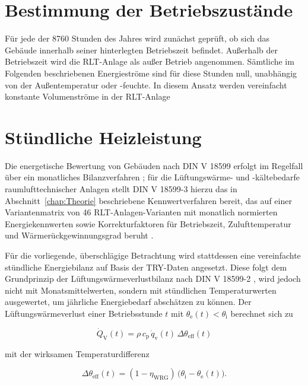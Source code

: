 \documentclass{scrreprt}
\begin{document}
\section{Bestimmung der Betriebszustände}
Für jede der 8760 Stunden des Jahres wird zunächst geprüft, ob sich das
Gebäude innerhalb seiner hinterlegten Betriebszeit befindet.
Außerhalb der Betriebszeit wird die \ac{RLT}-Anlage als außer Betrieb angenommen. Sämtliche im Folgenden beschriebenen Energieströme
sind für diese Stunden null, unabhängig von der Außentemperatur oder
-feuchte. In diesem Ansatz werden vereinfacht konstante Volumenströme in der \ac{RLT}-Anlage 

\section{Stündliche Heizleistung}
Die energetische Bewertung von Gebäuden nach DIN V 18599 erfolgt im
Regelfall über ein monatliches Bilanzverfahren \parencite{DIN1859910};
für die Lüftungswärme- und -kältebedarfe raumlufttechnischer Anlagen
stellt DIN V 18599-3 hierzu das in Abschnitt~\ref{chap:Theorie}
beschriebene Kennwertverfahren bereit, das auf einer Variantenmatrix
von 46 RLT-Anlagen-Varianten mit monatlich normierten Energiekennwerten
sowie Korrekturfaktoren für Betriebszeit, Zulufttemperatur und
Wärmerückgewinnungsgrad beruht \parencite{DIN185993}.

Für die vorliegende, überschlägige Betrachtung wird stattdessen eine
vereinfachte stündliche Energiebilanz auf Basis der \ac{TRY}-Daten
angesetzt. Diese folgt dem Grundprinzip der Lüftungswärmeverlustbilanz
nach DIN V 18599-2 \parencite{DIN185992}, wird jedoch nicht mit
Monatsmittelwerten, sondern mit stündlichen Temperaturwerten
ausgewertet, um jährliche Energiebedarf abschätzen zu können. Der
Lüftungswärmeverlust einer Betriebsstunde $t$ mit
$\theta_{\mathrm{e}}(t) < \theta_{\mathrm{i}}$ berechnet sich zu

\begin{equation}\label{eq:QdotV}
    \dot Q_{\mathrm{V}}(t) = \rho \, c_{\mathrm{p}} \, \dot q_{\mathrm{v}}(t) \, \Delta\theta_{\mathrm{eff}}(t)
\end{equation}

mit der wirksamen Temperaturdifferenz

\begin{equation}\label{eq:dtheta}
    \Delta\theta_{\mathrm{eff}}(t) = (1 - \eta_{\mathrm{WRG}}) \, \bigl(\theta_{\mathrm{i}} - \theta_{\mathrm{e}}(t)\bigr).
\end{equation}
\end{document}
